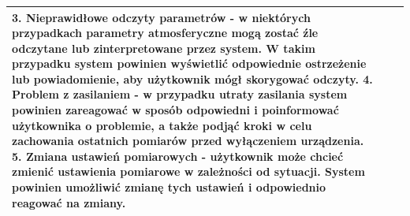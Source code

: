 \documentclass{article}
\begin{document}
\begin{center}
\begin{center}
\begin{tabular}{|l|l|l|}
{        \newline
        \textbf{3.} Nieprawidłowe odczyty parametrów - w niektórych przypadkach parametry atmosferyczne mogą zostać źle odczytane lub zinterpretowane przez system. W takim przypadku system powinien wyświetlić odpowiednie ostrzeżenie lub powiadomienie, aby użytkownik mógł skorygować odczyty.
        \newline
        \textbf{4.} Problem z zasilaniem - w przypadku utraty zasilania system powinien zareagować w sposób odpowiedni i poinformować użytkownika o problemie, a także podjąć kroki w celu zachowania ostatnich pomiarów przed wyłączeniem urządzenia.
        \newline
        \textbf{5.} Zmiana ustawień pomiarowych - użytkownik może chcieć zmienić ustawienia pomiarowe w zależności od sytuacji. System powinien umożliwić zmianę tych ustawień i odpowiednio reagować na zmiany.} \\
        \hline
        \end{tabular}
    \end{center}    

    \newpage


\end{center}
\end{document}
